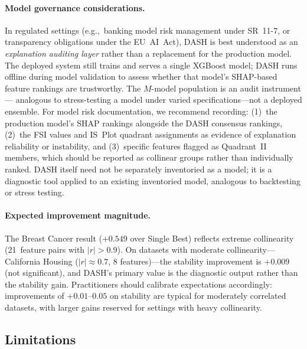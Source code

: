 \documentclass[10pt]{article}
\newcommand{\dash}{\textsc{DASH}}
\newcommand{\eg}{e.g.,\ }
\begin{document}
\paragraph{Model governance considerations.}
In regulated settings (\eg banking model risk management under SR~11-7,
or transparency obligations under the EU~AI~Act), \dash{} is best
understood as an \emph{explanation auditing layer} rather than a
replacement for the production model. The deployed system still trains
and serves a single XGBoost model; \dash{} runs offline during model
validation to assess whether that model's SHAP-based feature rankings
are trustworthy. The $M$-model population is an audit instrument---
analogous to stress-testing a model under varied specifications---not a
deployed ensemble. For model risk documentation, we recommend recording:
(1)~the production model's SHAP rankings alongside the \dash{} consensus
rankings, (2)~the FSI values and IS~Plot quadrant assignments as evidence
of explanation reliability or instability, and (3)~specific features
flagged as Quadrant~II members, which should be reported as collinear
groups rather than individually ranked.
\dash{} itself need not be separately inventoried as a model; it is a
diagnostic tool applied to an existing inventoried model, analogous to
backtesting or stress testing.

\paragraph{Expected improvement magnitude.}
The Breast Cancer result ($+0.549$ over Single Best) reflects extreme
collinearity (21~feature pairs with $|r| > 0.9$). On datasets with
moderate collinearity---California Housing ($|r| \approx 0.7$, 8
features)---the stability improvement is $+0.009$ (not significant),
and \dash{}'s primary value is the diagnostic output rather than the
stability gain. Practitioners should calibrate expectations
accordingly: improvements of $+0.01$--$0.05$ on stability are typical
for moderately correlated datasets, with larger gains reserved for
settings with heavy collinearity.

\subsection{Limitations}
\end{document}
